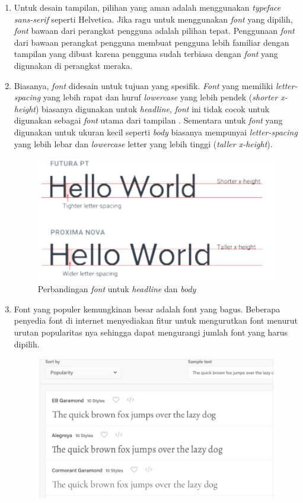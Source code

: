 \begin{enumerate}
	\item Untuk desain tampilan, pilihan yang aman adalah menggunakan \textit{typeface sans-serif} seperti Helvetica. Jika ragu untuk menggunakan \textit{font} yang dipilih, \textit{font} bawaan dari perangkat pengguna adalah pilihan tepat. Penggunaan \textit{font} dari bawaan perangkat pengguna membuat pengguna lebih familiar dengan tampilan yang dibuat karena pengguna sudah terbiasa dengan \textit{font} yang digunakan di perangkat meraka.
	\item Biasanya, \textit{font} didesain untuk tujuan yang spesifik. \textit{Font} yang memiliki \textit{letter-spacing} yang lebih rapat dan huruf \textit{lowercase} yang lebih pendek (\textit{shorter x-height}) biasanya digunakan untuk \textit{headline}, \textit{font} ini tidak cocok untuk digunakan sebagai \textit{font} utama dari tampilan . Sementara untuk \textit{font} yang digunakan untuk ukuran kecil seperti \textit{body} biasanya mempunyai \textit{letter-spacing} yang lebih lebar dan \textit{lowercase} letter yang lebih tinggi (\textit{taller x-height}).
	\begin{figure}[H]
		{\centering
			\includegraphics[keepaspectratio, width=12cm]{gambar/refactoring-ui-g9.png}
			\caption{Perbandingan \textit{font} untuk \textit{headline} dan \textit{body} \citep{refactoringui}}}
		\label{gambar:refactoring-ui-g9.png}
	\end{figure}
	\item Font yang populer kemungkinan besar adalah font yang bagus. Beberapa penyedia font di internet menyediakan fitur untuk mengurutkan font menurut urutan popularitas nya sehingga dapat mengurangi jumlah font yang harus dipilih.
	\begin{figure}[H]
		{\centering
			\includegraphics[keepaspectratio, width=12cm]{gambar/refactoring-ui-g10.png}
}
\end{figure}
\end{enumerate}
